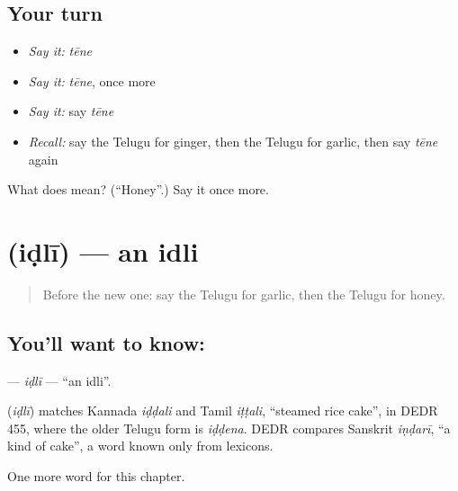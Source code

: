 \subsection*{Your turn}
\begin{itemize}
\raggedright
  \item \emph{Say it:} \emph{tēne}
  \item \emph{Say it:} \emph{tēne}, once more
  \item \emph{Say it:} say \emph{tēne}
  \item \emph{Recall:} say the Telugu for ginger, then the Telugu for garlic, then say \emph{tēne} again
\end{itemize}

\begin{tcolorbox}[breakable,colback=teal!4,colframe=teal!35!black,title={Before you move on}]
What does  mean? (\textquotedblleft{}Honey\textquotedblright{}.) Say it once more.
\end{tcolorbox}
\section[\texorpdfstring{\te{ఇడ్లీ} (iḍlī)}{ఇడ్లీ (iḍlī)}]{ (iḍlī) — an idli}

\label{lesson:TE-C119-idli}



\begin{quote}
Before the new one: say the Telugu for garlic, then the Telugu for honey.
\end{quote}

\subsection*{You'll want to know: }
\textbf{} — \emph{iḍlī} — \textquotedblleft{}an idli\textquotedblright{}.

\begin{cousinweb}
\textbf{} (\emph{iḍlī}) matches Kannada \emph{iḍḍali} and Tamil \emph{iṭṭali}, \textquotedblleft{}steamed rice cake\textquotedblright{}, in DEDR 455, where the older Telugu form is \emph{iḍḍena}. DEDR compares Sanskrit \emph{iṇḍarī}, \textquotedblleft{}a kind of cake\textquotedblright{}, a word known only from lexicons.
\end{cousinweb}

\begin{grammarlens}[title={What you've built}]
One more word for this chapter.
\end{grammarlens}

